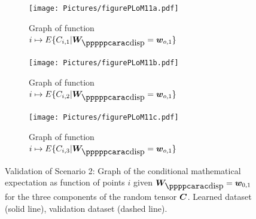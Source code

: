 \begin{figure}[!htb]
    \begin{center}
        \begin{subfigure}[b]{0.32\textwidth}
                \begin{center}
                    \texttt{[image: Pictures/figurePLoM11a.pdf]}
                \end{center}
                \caption{Graph of function $i\mapsto E\{ C_{i,1} \vert \bfW_\disppp = \bfw_{o,1} \}$}
                \label{fig:figurePLoM11a}
            \end{subfigure}
            \begin{subfigure}[b]{0.32\textwidth}
                \begin{center}
                    \texttt{[image: Pictures/figurePLoM11b.pdf]}
                \end{center}
                \caption{Graph of function $i\mapsto E\{ C_{i,2} \vert \bfW_\disppp = \bfw_{o,1} \}$}
                \label{fig:figurePLoM11b}
            \end{subfigure}
            \begin{subfigure}[b]{0.32\textwidth}
                \begin{center}
                    \texttt{[image: Pictures/figurePLoM11c.pdf]}
                \end{center}
                \caption{Graph of function $i\mapsto E\{ C_{i,3} \vert \bfW_\disppp = \bfw_{o,1} \}$}
                \label{fig:figurePLoM11c}
            \end{subfigure}
    \end{center}
    \caption[Validation of Scenario 2: Graph of the conditional mathematical expectation.]{Validation of Scenario 2: Graph of the conditional mathematical expectation as function of points $i$ given $\bfW_\dispp =\bfw_{0,1}$ for the three components of the random tensor ${\boldsymbol{C}}$.  Learned dataset (solid line), validation dataset (dashed line).}
    \label{fig:figurePLoM11}
\end{figure}
%
